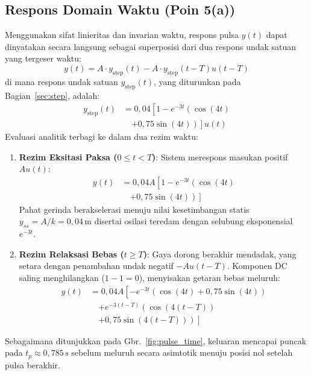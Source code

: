 \documentclass[journal]{IEEEtran}
\begin{document}
\subsection{Respons Domain Waktu (Poin 5(a))}
Menggunakan sifat linieritas dan invarian waktu, respons pulsa $y(t)$ dapat dinyatakan secara langsung sebagai superposisi dari dua respons undak satuan yang tergeser waktu:
\begin{equation}
    y(t) = A \cdot y_{\text{step}}(t) - A \cdot y_{\text{step}}(t - T) u(t - T)
    \label{eq:pulse_superpos}
\end{equation}
di mana respons undak satuan $y_{\text{step}}(t)$, yang diturunkan pada Bagian~\ref{sec:step}, adalah:
\begin{align}
    y_{\text{step}}(t) &= 0{,}04 \left[ 1 - e^{-3t} \left(\cos(4t) \right.\right. \nonumber \\
    &\quad \left.\left. + 0{,}75 \sin(4t)\right) \right] u(t)
    \label{eq:ystep_recall}
\end{align}
Evaluasi analitik terbagi ke dalam dua rezim waktu:
\begin{enumerate}
    \item \textbf{Rezim Eksitasi Paksa ($0 \le t < T$)}: Sistem merespons masukan positif $A u(t)$:
    \begin{align}
        y(t) &= 0{,}04 A \left[ 1 - e^{-3t}\left(\cos(4t) \right.\right. \nonumber \\
        &\quad \left.\left. + 0{,}75\sin(4t)\right) \right]
        \label{eq:pulse_regime1}
    \end{align}
    Pahat gerinda berakselerasi menuju nilai kesetimbangan statis $y_{ss} = A/k = 0{,}04\,\text{m}$ disertai osilasi teredam dengan selubung eksponensial $e^{-3t}$.
    
    \item \textbf{Rezim Relaksasi Bebas ($t \ge T$)}: Gaya dorong berakhir mendadak, yang setara dengan penambahan undak negatif $-A u(t - T)$. Komponen DC saling menghilangkan ($1 - 1 = 0$), menyisakan getaran bebas meluruh:
    \begin{align}
        y(t) &= 0{,}04 A \left[ -e^{-3t}\left(\cos(4t) + 0{,}75\sin(4t)\right) \right. \nonumber \\
        &\quad \left. + e^{-3(t-T)}\left(\cos(4(t-T)) \right.\right. \nonumber \\
        &\quad \left.\left. + 0{,}75\sin(4(t-T))\right) \right]
        \label{eq:pulse_regime2}
    \end{align}
\end{enumerate}
Sebagaimana ditunjukkan pada Gbr.~\ref{fig:pulse_time}, keluaran mencapai puncak pada $t_p \approx 0{,}785\,\text{s}$ sebelum meluruh secara asimtotik menuju posisi nol setelah pulsa berakhir.
\end{document}
